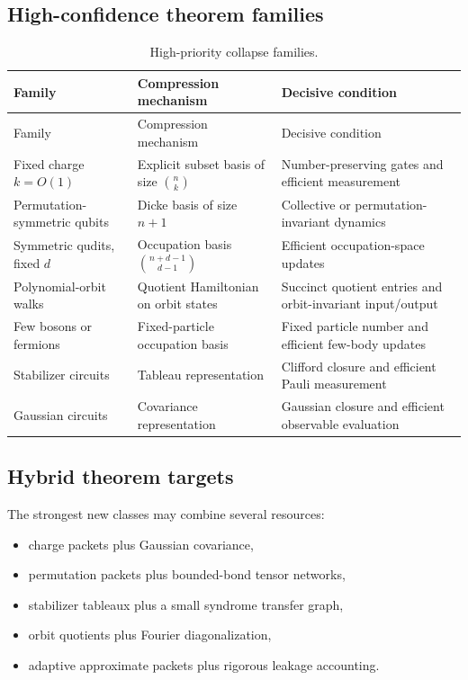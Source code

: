 \subsection{High-confidence theorem families}
\begin{longtable}{@{}L{.25\textwidth}L{.33\textwidth}L{.32\textwidth}@{}}
\caption{High-priority collapse families.}\\
\toprule
Family & Compression mechanism & Decisive condition\\
\midrule
\endfirsthead
\toprule
Family & Compression mechanism & Decisive condition\\
\midrule
\endhead
Fixed charge $k=O(1)$ & Explicit subset basis of size $\binom nk$ & Number-preserving gates and efficient measurement\\
Permutation-symmetric qubits & Dicke basis of size $n+1$ & Collective or permutation-invariant dynamics\\
Symmetric qudits, fixed $d$ & Occupation basis $\binom{n+d-1}{d-1}$ & Efficient occupation-space updates\\
Polynomial-orbit walks & Quotient Hamiltonian on orbit states & Succinct quotient entries and orbit-invariant input/output\\
Few bosons or fermions & Fixed-particle occupation basis & Fixed particle number and efficient few-body updates\\
Stabilizer circuits & Tableau representation & Clifford closure and efficient Pauli measurement\\
Gaussian circuits & Covariance representation & Gaussian closure and efficient observable evaluation\\
\bottomrule
\end{longtable}

\subsection{Hybrid theorem targets}
The strongest new classes may combine several resources:

\begin{itemize}
\item charge packets plus Gaussian covariance,
\item permutation packets plus bounded-bond tensor networks,
\item stabilizer tableaux plus a small syndrome transfer graph,
\item orbit quotients plus Fourier diagonalization,
\item adaptive approximate packets plus rigorous leakage accounting.
\end{itemize}

